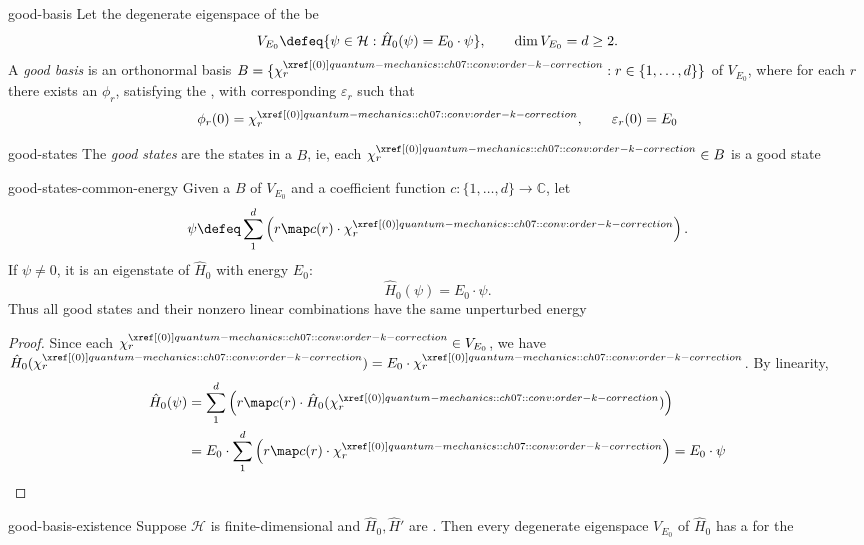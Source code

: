 \documentclass[12pt]{article}
\begin{document}
\begin{dfn}{good-basis}
  Let the degenerate eigenspace of the  be
  \[
    V_{E_0} \defeq \{\psi\in\mathcal H : \hat H_0(\psi)=E_0\cdot\psi\},
    \qquad \dim V_{E_0}=d\geq2.
  \]
  A \emph{good basis} is an orthonormal basis $B=\{\chi_r^{\porder{0}} : r\in\{1,\ldots,d\}\}$ of $V_{E_0}$, where for each $r$ there exists an  $\phi_r$, satisfying the , with corresponding  $\varepsilon_r$ such that
  \[
    \phi_r(0)=\chi_r^{\porder{0}},
    \qquad \varepsilon_r(0)=E_0
  \]
\end{dfn}

\begin{dfn}{good-states}
  The \emph{good states} are the states in a  $B$, ie, each $\chi_r^{\porder{0}}\in B$ is a good state
\end{dfn}

\begin{cor}{good-states-common-energy}
  Given a  $B$ of $V_{E_0}$ and a coefficient function $c : \{1,\ldots,d\}\to\mathbb C$, let
  \[
    \psi \defeq \sum_1^d\left(r \map c(r)\cdot\chi_r^{\porder{0}}\right).
  \]
  If $\psi\ne0$, it is an eigenstate of $\hat H_0$ with energy $E_0$:
  \[
    \hat H_0(\psi)=E_0\cdot\psi.
  \]
  Thus all good states and their nonzero linear combinations have the same unperturbed energy
\end{cor}

\begin{proof}
  Since each $\chi_r^{\porder{0}}\in V_{E_0}$, we have $\hat H_0(\chi_r^{\porder{0}})=E_0\cdot\chi_r^{\porder{0}}$. By linearity,
  \[
    \begin{aligned}
      \hat H_0(\psi)
      &= \sum_1^d\left(r \map c(r)\cdot\hat H_0(\chi_r^{\porder{0}})\right) \\
      &= E_0\cdot\sum_1^d\left(r \map c(r)\cdot\chi_r^{\porder{0}}\right)
      = E_0\cdot\psi
    \end{aligned}
  \]
\end{proof}

\begin{thm}{good-basis-existence}
  Suppose $\mathcal H$ is finite-dimensional and $\hat H_0,\hat H'$ are . Then every degenerate eigenspace $V_{E_0}$ of $\hat H_0$ has a  for the 
\end{thm}
\end{document}
